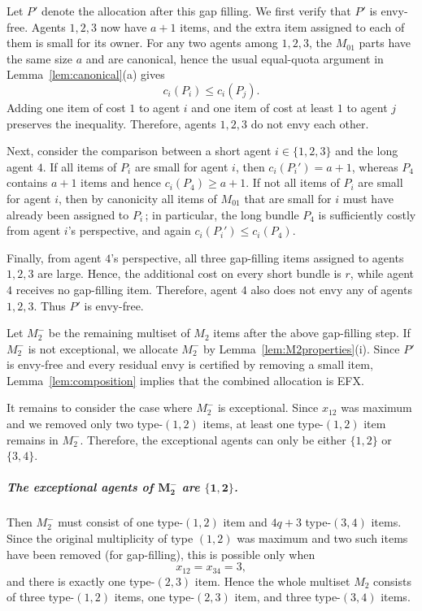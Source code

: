 \documentclass{article}
\theoremstyle{definition}
\begin{document}
Let $P'$ denote the allocation after this gap filling.  We first verify that
$P'$ is envy-free.  Agents $1,2,3$ now have $a+1$ items, and the extra item
assigned to each of them is small for its owner.  For any two agents among
$1,2,3$, the $M_{01}$ parts have the same size $a$ and are canonical, hence
the usual equal-quota argument in Lemma~\ref{lem:canonical}(a) gives
\[
    c_i(P_i)\le c_i(P_j).
\]
Adding one item of cost $1$ to agent $i$ and one item of cost at least $1$ to
agent $j$ preserves the inequality.  Therefore, agents $1,2,3$ do not envy each
other.

Next, consider the comparison between a short agent $i\in\{1,2,3\}$ and the
long agent $4$.  If all items of $P_i$ are small for agent $i$, then
$c_i(P_i')=a+1$, whereas $P_4$ contains $a+1$ items and hence
$c_i(P_4)\ge a+1$.  If not all items of $P_i$ are small for agent $i$, then
by canonicity all items of $M_{01}$ that are small for $i$ must have already been assigned to $P_i$\,; in particular, the long bundle
$P_4$ is sufficiently costly from agent $i$'s perspective, and again
$c_i(P_i')\le c_i(P_4)$. 

Finally, from agent $4$'s perspective, all three gap-filling items assigned to agents $1,2,3$ are large.  Hence, the additional
cost on every short bundle is $r$, while agent $4$ receives no gap-filling
item.  Therefore, agent $4$ also does not envy any of agents $1,2,3$.
Thus $P'$ is envy-free.

Let $M_2^-$ be the remaining multiset of $M_2$ items after the above
gap-filling step.  If $M_2^-$ is not exceptional, we allocate $M_2^-$ by
Lemma~\ref{lem:M2properties}(i).  Since $P'$ is envy-free and every residual
envy is certified by removing a small item, Lemma~\ref{lem:composition} implies
that the combined allocation is EFX.

It remains to consider the case where $M_2^-$ is exceptional.  Since
$x_{12}$ was maximum and we removed only two type-$(1,2)$ items, at least one
type-$(1,2)$ item remains in $M_2^-$.  Therefore, the exceptional agents can
only be either $\{1,2\}$ or $\{3,4\}$.

\subparagraph{The exceptional agents of $\boldsymbol{M_2^-}$ are $\boldsymbol{\{1,2\}}$. } Then $M_2^-$ must consist
of one type-$(1,2)$ item and $4q+3$ type-$(3,4)$ items.  Since the original
multiplicity of type $(1,2)$ was maximum and two such items have been removed (for gap-filling),
this is possible only when
\[
    x_{12}=x_{34}=3,
\]
and there is exactly one type-$(2,3)$ item.  Hence the whole multiset $M_2$
consists of three type-$(1,2)$ items, one type-$(2,3)$ item, and three
type-$(3,4)$ items.
\end{document}
